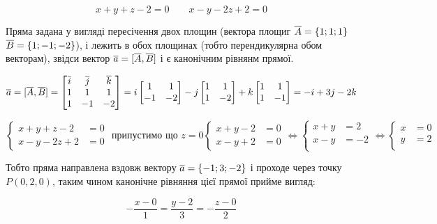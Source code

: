 {}

$$
  x + y + z - 2 = 0 \qquad x-y-2z+2 = 0
$$

Пряма задана у вигляді пересічення двох площин (вектора площиг $\overline{A} = \{1;1;1\}$ $\overline{B} = \{1;-1;-2\}$), і лежить в обох площинах (тобто перендикулярна обом векторам), звідси вектор $\overline{a} = [\overline{A}, \overline{B}]$ і є канонічним рівнянм прямої.


$$
\overline{a} = [\overline{A}, \overline{B}] = \begin{bmatrix}
    \overline{i} & \overline{j} & \overline{k}  \\
    1     & 1     & 1      \\
    1     & -1    & -2     \\
\end{bmatrix}
=
  i \begin{bmatrix} 1 & 1 \\ -1 & -2 \end{bmatrix}
- j \begin{bmatrix} 1 & 1 \\ 1 & -2 \end{bmatrix}
+ k \begin{bmatrix} 1 & 1 \\ 1 & -1 \end{bmatrix}
= -i +3j -2k
$$

$$
\begin{cases}
  x + y + z - 2 & = 0\\
  x-y-2z+2& = 0
\end{cases}
{\text{ припустимо що }z=0}
\begin{cases}
  x + y- 2 & = 0\\
  x-y+2& = 0
\end{cases} \iff
\begin{cases}
  x + y & = 2  \\
  x - y & = -2 \\
\end{cases} \iff
\begin{cases}
  x & = 0  \\
  y & = 2 \\
\end{cases}
$$

Тобто пряма направлена вздовж вектору $\overline{a} = \{-1;3;-2\}$ і проходе через точку $P (0, 2, 0)$, таким чином канонічне рівняння цієї прямої прийме вигляд:

$$
\boxed{ - \dfrac{x-0}{1} = \dfrac{y-2}{3} = - \dfrac{z-0}{2} }
$$
